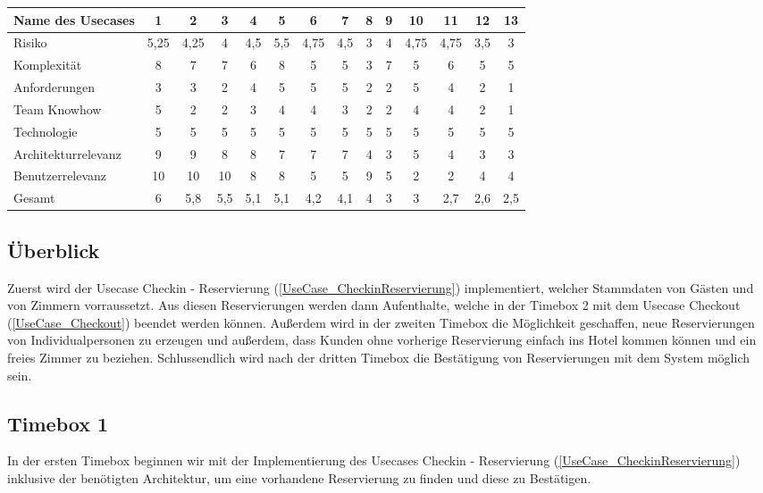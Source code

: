 \begin{tabular} { | l | c c c c c c c c c c c c c | }
	\hline
	Name des Usecases & 1 & 2 & 3 & 4 & 5 & 6 & 7 & 8 & 9 & 10 & 11 & 12 & 13 \\ \hline
	Risiko & 5,25 &	4,25 & 4 & 4,5 & 5,5 & 4,75 & 4,5 & 3 & 4 & 4,75 & 4,75 & 3,5 & 3\\
	Komplexität & 8 & 7 & 7 & 6 & 8 & 5 & 5 & 3 & 7 & 5 & 6 & 5 & 5\\
	Anforderungen & 3 & 3 & 2 & 4 & 5 & 5 & 5 & 2 & 2 & 5 & 4 & 2 & 1\\
	Team Knowhow & 5 & 2 & 2 & 3 & 4 & 4 & 3 & 2 & 2 & 4 & 4 & 2 & 1\\
	Technologie & 5 & 5 & 5 & 5 & 5 & 5 & 5 & 5  & 5 & 5 & 5 & 5 & 5\\
	\hline
	Architekturrelevanz	& 9 & 9 & 8 & 8 & 7 & 7 & 7 & 4 & 3 & 5 & 4 & 3 & 3\\
	Benutzerrelevanz & 10 & 10 & 10 & 8 & 8 & 5 & 5 & 9 & 5 & 2 & 2 & 4 & 4 \\
	\hline \hline
	Gesamt & 6 & 5,8 & 5,5 & 5,1 & 5,1 & 4,2 & 4,1 & 4 & 3 & 3 & 2,7 & 2,6 & 2,5\\
\hline
\end{tabular}



\subsection{Überblick}
Zuerst wird der Usecase Checkin - Reservierung (\ref{UseCase_CheckinReservierung}) implementiert, welcher \Gls{Stammdaten} von Gästen und von \Gls{Zimmer}n vorraussetzt.
Aus diesen \Gls{Reservierung}en werden dann \Gls{Aufenthalt}e, welche in der Timebox 2 mit dem Usecase Checkout (\ref{UseCase_Checkout}) beendet werden können.
Außerdem wird in der zweiten Timebox die Möglichkeit geschaffen, neue \Gls{Reservierung}en von Individualpersonen zu erzeugen und außerdem,
dass \Gls{Kunde}n ohne vorherige \Gls{Reservierung} einfach ins Hotel kommen können und ein freies \Gls{Zimmer} zu beziehen.
Schlussendlich wird nach der dritten Timebox die Bestätigung von \Gls{Reservierung}en mit dem System möglich sein.

\subsection{Timebox 1}
In der ersten Timebox beginnen wir mit der Implementierung des Usecases Checkin - Reservierung (\ref{UseCase_CheckinReservierung}) inklusive der benötigten Architektur,
um eine vorhandene \Gls{Reservierung} zu finden und diese zu Bestätigen.

